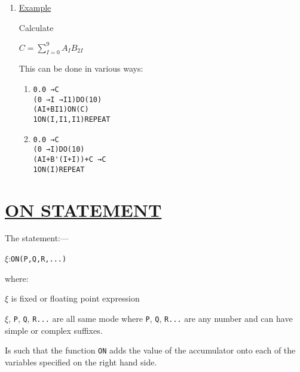 \documentclass[10pt, a4paper, oneside]{article}
\newcommand{\myuline}[1]{\uline{#1}}
\newcommand{\mytt}[1]{\texttt{\scriptsize #1}}
\newcommand{\mytt}[1]{\texttt{\small #1}}
\begin{document}
\begin{multicols}{2}
\begin{enumerate}
\item \myuline{Example}

Calculate

\begin{addmargin}[1cm]{1em}%
\begin{math}
C = \displaystyle\sum_{I=0}^{9}{A_{I}B_{2I}}
\end{math}
\end{addmargin}

This can be done in various ways:

\renewcommand{\labelenumii}{\ifnum\value{enumii}=1 e.g. (\alph{enumii})\else or (\alph{enumii})\fi}
\begin{enumerate}

\item
\begin{addmargin}[1cm]{1em}%
\begin{lstlisting}
0.0 →C
(0 →I →I1)DO(10)
(AI+BI1)ON(C)
1ON(I,I1,I1)REPEAT
\end{lstlisting}
\end{addmargin}

\item
\begin{addmargin}[1cm]{1em}%
\begin{lstlisting}
0.0 →C
(0 →I)DO(10)
(AI+B'(I+I))+C →C
1ON(I)REPEAT
\end{lstlisting}
\end{addmargin}

\end{enumerate}
\end{enumerate}


\section{\myuline{ON STATEMENT}}

The statement:—

\begin{addmargin}[1cm]{1em}%
\vspace{0.2cm}
$\xi$:\mytt{ON(P,Q,R,...)}
\end{addmargin}

where:

$\xi$ is fixed or floating point expression

$\xi$, \mytt{P}, \mytt{Q}, \mytt{R...} are all same mode where \mytt{P}, \mytt{Q}, \mytt{R...}
are any number and can have simple or complex suffixes.

Is such that the function \mytt{ON} adds the value of the
accumulator onto each of the variables specified on
the right hand side.


\end{multicols}
\end{document}
